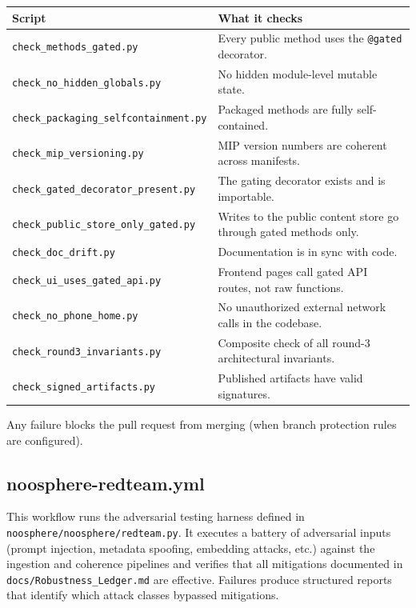 \documentclass[11pt,letterpaper]{article}
\newcommand{\file}[1]{\texttt{#1}}
\newcommand{\cmd}[1]{\texttt{#1}}
\begin{document}
\begin{longtable}{p{5cm} p{9.5cm}}
\toprule
\textbf{Script} & \textbf{What it checks} \\
\midrule
\endhead
\file{check\_methods\_gated.py} & Every public method uses the \cmd{@gated} decorator. \\
\file{check\_no\_hidden\_globals.py} & No hidden module-level mutable state. \\
\file{check\_packaging\_selfcontainment.py} & Packaged methods are fully self-contained. \\
\file{check\_mip\_versioning.py} & MIP version numbers are coherent across manifests. \\
\file{check\_gated\_decorator\_present.py} & The gating decorator exists and is importable. \\
\file{check\_public\_store\_only\_gated.py} & Writes to the public content store go through gated methods only. \\
\file{check\_doc\_drift.py} & Documentation is in sync with code. \\
\file{check\_ui\_uses\_gated\_api.py} & Frontend pages call gated API routes, not raw functions. \\
\file{check\_no\_phone\_home.py} & No unauthorized external network calls in the codebase. \\
\file{check\_round3\_invariants.py} & Composite check of all round-3 architectural invariants. \\
\file{check\_signed\_artifacts.py} & Published artifacts have valid signatures. \\
\bottomrule
\end{longtable}

Any failure blocks the pull request from merging (when branch protection rules are configured).

\subsection{noosphere-redteam.yml}

This workflow runs the adversarial testing harness defined in \file{noosphere/noosphere/redteam.py}. It executes a battery of adversarial inputs (prompt injection, metadata spoofing, embedding attacks, etc.) against the ingestion and coherence pipelines and verifies that all mitigations documented in \file{docs/Robustness\_Ledger.md} are effective. Failures produce structured reports that identify which attack classes bypassed mitigations.

\end{document}
